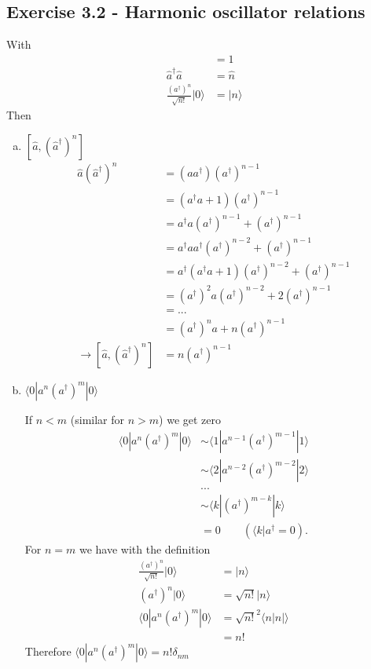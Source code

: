 \documentclass[../main.tex]{subfiles}
\begin{document}
\subsection*{Exercise 3.2 - Harmonic oscillator relations}
With
\begin{align}
[\hat{a},\hat{a}^\dagger]&=1\\
\hat{a}^\dagger\hat{a}&=\hat{n}\\
\frac{(a^\dagger)^n}{\sqrt{n!}}|0\rangle&=|n\rangle
\end{align}
Then
\begin{enumerate}[(a)]
\item $[\hat{a},(\hat{a}^\dagger)^n]$
\begin{align}
\hat{a}(\hat{a}^\dagger)^n
&=(a a^\dagger)(a^\dagger)^{n-1}\\
&=(a^\dagger a+1)(a^\dagger)^{n-1}\\
&=a^\dagger a(a^\dagger)^{n-1}+(a^\dagger)^{n-1}\\
&=a^\dagger aa^\dagger(a^\dagger)^{n-2}+(a^\dagger)^{n-1}\\
&=a^\dagger (a^\dagger a+1)(a^\dagger)^{n-2}+(a^\dagger)^{n-1}\\
&=(a^\dagger)^2 a(a^\dagger)^{n-2}+2(a^\dagger)^{n-1}\\
&=...\\
&=(a^\dagger)^{n}a+n(a^\dagger)^{n-1}\\
\rightarrow[\hat{a},(\hat{a}^\dagger)^n]&=n(a^\dagger)^{n-1}
\end{align}

\item $\langle0|a^n(a^\dagger)^m|0\rangle$

If $n<m$ (similar for $n>m$) we get zero 
\begin{align}
\langle0|a^n(a^\dagger)^m|0\rangle
&\sim\langle1|a^{n-1}(a^\dagger)^{m-1}|1\rangle\\
&\sim\langle2|a^{n-2}(a^\dagger)^{m-2}|2\rangle\\
&...\\
&\sim\langle k|(a^\dagger)^{m-k}|k\rangle\\
&=0\qquad (\langle k|a^\dagger=0).
\end{align}
For $n=m$ we have with the definition
\begin{align}
\frac{(a^\dagger)^n}{\sqrt{n!}}|0\rangle&=|n\rangle\\
(a^\dagger)^n|0\rangle&=\sqrt{n!}|n\rangle\\
\langle0|a^n(a^\dagger)^m|0\rangle&=\sqrt{n!}^2\langle n|n|\rangle\\
&=n!
\end{align}
Therefore  $\langle0|a^n(a^\dagger)^m|0\rangle=n!\delta_{nm}$


\end{enumerate}
\end{document}
